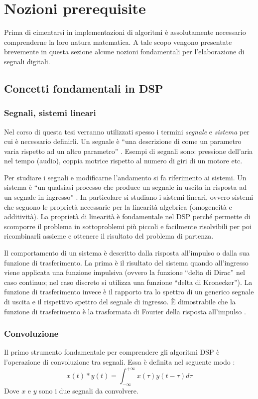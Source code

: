 \chapter{Nozioni prerequisite}
Prima di cimentarsi in implementazioni di algoritmi è assolutamente necessario comprenderne la loro natura matematica. A tale scopo vengono presentate brevemente in questa sezione alcune nozioni fondamentali per l'elaborazione di segnali digitali.

\section{Concetti fondamentali in DSP}
\subsection{Segnali, sistemi lineari}
Nel corso di questa tesi verranno utilizzati spesso i termini \textit{segnale} e \textit{sistema} per cui è necessario definirli. Un segnale è ``una descrizione di come un parametro varia rispetto ad un altro parametro'' \cite[pp.~87-88]{dspguide}. Esempi di segnali sono: pressione dell'aria nel tempo (audio), coppia motrice rispetto al numero di giri di un motore etc.

Per studiare i segnali e modificarne l'andamento si fa riferimento ai sistemi. Un sistema è ``un qualsiasi processo che produce un segnale in uscita in risposta ad un segnale in ingresso'' \cite[pp.~87-88]{dspguide}. In particolare si studiano i sistemi lineari, ovvero sistemi che seguono le proprietà necessarie per la linearità algebrica (omogeneità e additività). La proprietà di linearità è fondamentale nel DSP perché permette di scomporre il problema in sottoproblemi più piccoli e facilmente risolvibili per poi ricombinarli assieme e ottenere il risultato del problema di partenza.

Il comportamento di un sistema è descritto dalla risposta all'impulso o dalla sua funzione di trasferimento. La prima è il risultato del sistema quando all'ingresso viene applicata una funzione impulsiva (ovvero la funzione ``delta di Dirac'' nel caso continuo; nel caso discreto si utilizza una funzione ``delta di Kronecker''). La funzione di trasferimento invece è il rapporto tra lo spettro di un generico segnale di uscita e il rispettivo spettro del segnale di ingresso. È dimostrabile che la funzione di trasferimento è la trasformata di Fourier della risposta all'impulso \cite[pp.~3.29-3.31]{calandrino}.

\subsection{Convoluzione}
Il primo strumento fondamentale per comprendere gli algoritmi DSP è l'operazione di convoluzione tra segnali. Essa è definita nel seguente modo \cite[p.~2.10]{calandrino}:
\begin{equation}
    x(t) * y(t) = \int_{-\infty}^{+\infty}x(\tau)y(t-\tau)d\tau
\end{equation}
Dove $x$ e $y$ sono i due segnali da convolvere.

